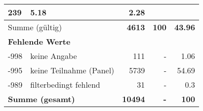 \begin{longtable}{lXrrr}
       \num{239} &
       \num[round-mode=places,round-precision=2]{5,18} &
         \num[round-mode=places,round-precision=2]{2,28} \\
     \midrule
     \multicolumn{2}{l}{Summe (gültig)} &
       \textbf{\num{4613}} &
     \textbf{100} &
       \textbf{\num[round-mode=places,round-precision=2]{43,96}} \\
     \multicolumn{5}{l}{\textbf{Fehlende Werte}}\\
       -998 &
       keine Angabe &
         \num{111} &
        - &
         \num[round-mode=places,round-precision=2]{1,06} \\
       -995 &
       keine Teilnahme (Panel) &
         \num{5739} &
        - &
         \num[round-mode=places,round-precision=2]{54,69} \\
       -989 &
       filterbedingt fehlend &
         \num{31} &
        - &
         \num[round-mode=places,round-precision=2]{0,3} \\
     \midrule
     \multicolumn{2}{l}{\textbf{Summe (gesamt)}} &
          \textbf{\num{10494}} &
        \textbf{-} &
        \textbf{100} \\
     \bottomrule
     \end{longtable}
     
